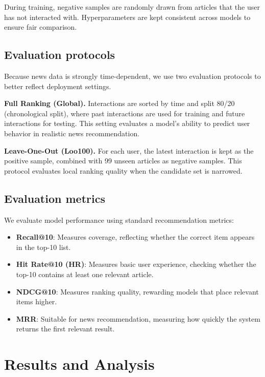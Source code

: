 \documentclass[11pt]{article}
\begin{document}
During training,
negative samples are randomly drawn from articles
that the user has not interacted with.
Hyperparameters are kept consistent across models
to ensure fair comparison.

\subsection{Evaluation protocols}
Because news data is strongly time-dependent, we use two evaluation protocols
to better reflect deployment settings.

\textbf{Full Ranking (Global).}
Interactions are sorted by time and split 80/20 (chronological split),
where past interactions are used for training and future interactions for testing.
This setting evaluates a model's ability to predict user behavior in realistic news recommendation.

\textbf{Leave-One-Out (Loo100).}
For each user, the latest interaction is kept as the positive sample,
combined with 99 unseen articles as negative samples.
This protocol evaluates local ranking quality
when the candidate set is narrowed.

\subsection{Evaluation metrics}
We evaluate model performance using standard recommendation metrics:
\begin{itemize}
    \item \textbf{Recall@10}: Measures coverage,
          reflecting whether the correct item appears in the top-10 list.
    \item \textbf{Hit Rate@10 (HR)}: Measures basic user experience,
          checking whether the top-10 contains at least one relevant article.
    \item \textbf{NDCG@10}: Measures ranking quality,
          rewarding models that place relevant items higher.
    \item \textbf{MRR}: Suitable for news recommendation,
          measuring how quickly the system returns the first relevant result.
\end{itemize}

\section{Results and Analysis}
\label{sec:results}
\end{document}
